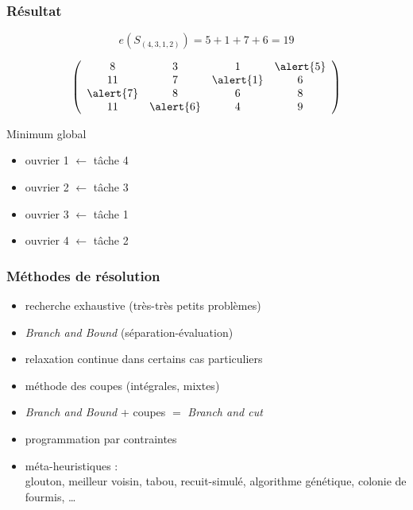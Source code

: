 \documentclass{beamer}
\begin{document}
\begin{frame}
  \frametitle{Résultat}


  \[
  e(S_{(4,3,1,2)}) = 5 + 1 + 7 + 6 = 19
  \]
  
  \[
  \left(
  \begin{array}{cccc}
    8 & 3 & 1 & \alert{5} \\
    11 & 7 & \alert{1} & 6 \\
    \alert{7} & 8 & 6 & 8 \\
    11 & \alert{6} & 4 & 9 
  \end{array}
  \right)
  \]

  \begin{block}{Minimum global}
  \begin{itemize}
    \item ouvrier 1 $\leftarrow$ tâche 4
    \item ouvrier 2 $\leftarrow$ tâche 3
    \item ouvrier 3 $\leftarrow$ tâche 1
    \item ouvrier 4 $\leftarrow$ tâche 2
  \end{itemize}
  \end{block}
\end{frame}

\begin{frame}
  \frametitle{Méthodes de résolution}

  \begin{itemize}
  \item recherche exhaustive (très-très petits problèmes)
  \item \alert{\emph{Branch and Bound}} (séparation-évaluation)
  \item relaxation continue dans certains cas particuliers
  \item méthode des coupes (intégrales, mixtes)
  \item \emph{Branch and Bound} + coupes $=$ \emph{Branch and cut}
  \item programmation par contraintes
  \item méta-heuristiques : \\
      glouton, meilleur voisin, tabou, recuit-simulé, algorithme génétique, colonie de fourmis, \dots
  \end{itemize}
  
\end{frame}
\end{document}
